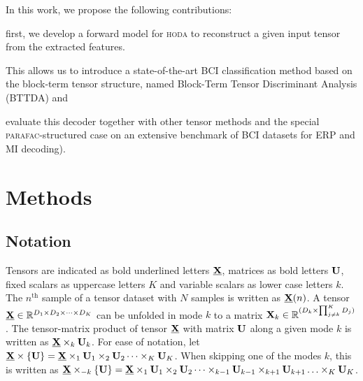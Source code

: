 \documentclass[twocolumn]{article}
\begin{document}

In this work, we propose the following contributions:
\begin{enumerate*}[label={\arabic*)}]
  \item first, we develop a forward model for \textsc{hoda} to reconstruct a
    given input tensor from the extracted features.
  \item This allows us to introduce a state-of-the-art BCI classification method based on the
    block-term tensor structure, named Block-Term Tensor Discriminant Analysis
    (\textsc{BTTDA}) and
  \item evaluate this decoder together with other tensor methods and the
    special \textsc{parafac}-structured case on an extensive benchmark of BCI
    datasets for ERP and MI decoding).
\end{enumerate*}

\section{Methods}

\subsection{Notation}
Tensors are indicated as bold underlined letters $\ten{X}$, matrices as bold
letters $\mat{U}$, fixed scalars as uppercase letters $K$ and variable
scalars as lower case letters $k$.
The $n^\text{th}$ sample of a tensor dataset with $N$ samples is written as
$\ten{X}(n)$.
A tensor $\ten{X}\in \mathbb{R}^{D_1\times D_2 \times \cdots \times D_K}$ can be unfolded in mode
$k$ to a matrix $\mat{X}_k\in\mathbb{R}^{(D_k\times\prod_{j\neq k}^K D_j)}$.
The tensor-matrix product of tensor $\ten{X}$ with matrix $\mat{U}$ along a
given mode $k$ is written as $\ten{X}\mpr{\mat{U}}{k}$. For ease of notation, let
$\ten{X}\mmpr{\mat{U}} =
	\ten{X}\mpr{\mat{U}}{1}\mpr{\mat{U}}{2}\cdots\mpr{\mat{U}}{K}$.
When skipping one of the modes $k$, this is
written as $\ten{X}\mmprs{\mat{U}}{k} =
	\ten{X}\mpr{\mat{U}}{1}\mpr{\mat{U}}{2}\cdots\mpr{\mat{U}}{k-1}\mpr{\mat{U}}{k+1}\ldots\mpr{\mat{U}}{K}$.
\end{document}
